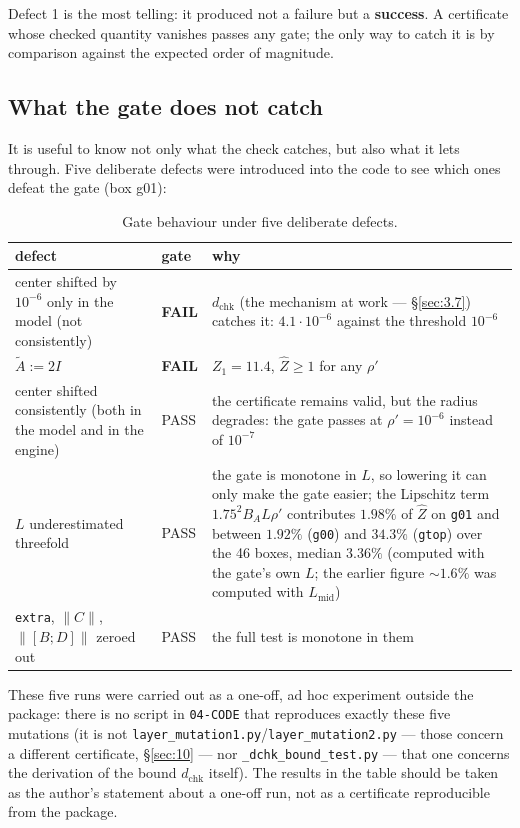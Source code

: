 Defect 1 is the most telling: it produced not a failure but a \textbf{success}.
A certificate whose checked quantity vanishes passes any gate; the only
way to catch it is by comparison against the expected order of magnitude.



\subsection{What the gate does not catch}\label{sec:4.10}

It is useful to know not only what the check catches, but also what it
lets through. Five deliberate defects were introduced into the code to see
which ones defeat the gate (box g01):

\begin{table}[h]
\centering
\caption{Gate behaviour under five deliberate defects.}\label{tab:gate-defects}
\begin{tabular}{p{}p{}p{}}
\toprule
defect & gate & why \\
\midrule
center shifted by $10^{-6}$ only in the model (not consistently) & \textbf{FAIL} & $d_{\mathrm{chk}}$ (the mechanism at work --- \S\ref{sec:3.7}) catches it: $4.1\cdot 10^{-6}$ against the threshold $10^{-6}$ \\
$\widetilde{A} := 2I$ & \textbf{FAIL} & $Z_1 = 11.4$, $\widehat{Z} \ge 1$ for any $\rho'$ \\
center shifted consistently (both in the model and in the engine) & PASS & the certificate remains valid, but the radius degrades: the gate passes at $\rho' = 10^{-6}$ instead of $10^{-7}$ \\
$L$ underestimated threefold & PASS & the gate is monotone in $L$, so lowering it can only make the gate easier; the Lipschitz term $1.75^{2}B_{A}L\rho'$ contributes $1.98\%$ of $\widehat{Z}$ on \texttt{g01} and between $1.92\%$ (\texttt{g00}) and $34.3\%$ (\texttt{gtop}) over the 46 boxes, median $3.36\%$ (computed with the gate's own $L$; the earlier figure $\sim 1.6\%$ was computed with $L_{\mathrm{mid}}$) \\
\texttt{extra}, $\|C\|$, $\|[B;D]\|$ zeroed out & PASS & the full test is monotone in them \\
\bottomrule
\end{tabular}
\end{table}
\FloatBarrier

These five runs were carried out as a one-off, ad hoc experiment outside
the package: there is no script in \texttt{04-CODE} that reproduces exactly these
five mutations (it is not \texttt{layer\_\allowbreak mutation1.py}/\texttt{layer\_\allowbreak mutation2.py} --- those
concern a different certificate, \S\ref{sec:10} --- nor \texttt{\_\allowbreak dchk\_\allowbreak bound\_\allowbreak test.py} --- that one
concerns the derivation of the bound $d_{\mathrm{chk}}$ itself). The results in the
table should be taken as the author's statement about a one-off run, not
as a certificate reproducible from the package.

